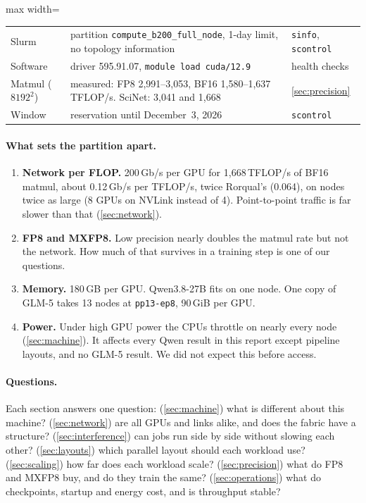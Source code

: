 \begin{table}[h]
\begin{adjustbox}{max width=\linewidth}
\begin{tabular}{lll}
    Slurm & partition \texttt{compute\_b200\_full\_node}, 1-day limit, no topology information & \texttt{sinfo}, \texttt{scontrol} \\
    Software & driver 595.91.07, \texttt{module load cuda/12.9} & health checks \\
    Matmul ($8192^2$) & measured: FP8 2,991--3,053, BF16 1,580--1,637\,TFLOP/s. SciNet: 3,041 and 1,668 & \cref{sec:precision} \\
    Window & reservation until December~3, 2026 & \texttt{scontrol} \\
    \bottomrule
  \end{tabular}
  \end{adjustbox}
\end{table}

\paragraph{What sets the partition apart.}
\begin{enumerate}[leftmargin=*, itemsep=1pt]
  \item \textbf{Network per FLOP.} 200\,Gb/s per GPU for 1,668\,TFLOP/s of BF16 matmul, about 0.12\,Gb/s per TFLOP/s, twice Rorqual's (0.064), on nodes twice as large (8 GPUs on NVLink instead of 4). Point-to-point traffic is far slower than that (\cref{sec:network}).
  \item \textbf{FP8 and MXFP8.} Low precision nearly doubles the matmul rate but not the network. How much of that survives in a training step is one of our questions.
  \item \textbf{Memory.} 180\,GB per GPU. Qwen3.8-27B fits on one node. One copy of GLM-5 takes 13 nodes at \texttt{pp13-ep8}, 90\,GiB per GPU.
  \item \textbf{Power.} Under high GPU power the CPUs throttle on nearly every node (\cref{sec:machine}). It affects every Qwen result in this report except pipeline layouts, and no GLM-5 result. We did not expect this before access.
\end{enumerate}

\paragraph{Questions.} Each section answers one question:
(\cref{sec:machine}) what is different about this machine?
(\cref{sec:network}) are all GPUs and links alike, and does the fabric have a structure?
(\cref{sec:interference}) can jobs run side by side without slowing each other?
(\cref{sec:layouts}) which parallel layout should each workload use?
(\cref{sec:scaling}) how far does each workload scale?
(\cref{sec:precision}) what do FP8 and MXFP8 buy, and do they train the same?
(\cref{sec:operations}) what do checkpoints, startup and energy cost, and is throughput stable?

